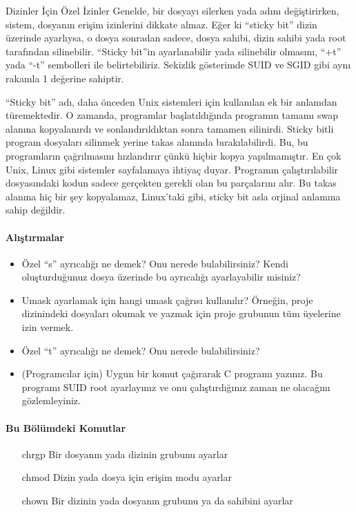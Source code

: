 \begin{section}{Dizinler İçin Özel İzinler}
Genelde, bir dosyayı silerken yada adını değiştirirken, sistem, dosyanın erişim izinlerini dikkate almaz. Eğer ki “sticky bit” dizin üzerinde ayarlıysa, o dosya sonradan sadece, dosya sahibi, dizin sahibi yada root tarafından silinebilir. “Sticky bit”in ayarlanabilir yada silinebilir olmasını, “+t” yada “-t” sembolleri ile belirtebiliriz. Sekizlik gösterimde SUID ve SGID gibi aynı rakamla 1 değerine sahiptir.

“Sticky bit” adı, daha önceden Unix sistemleri için kullanılan ek bir anlamdan türemektedir. O zamanda, programlar başlatıldığında programın tamamı swap alanına kopyalanırdı ve sonlandırıldıktan sonra tamamen silinirdi. Sticky bitli program dosyaları silinmek yerine takas alanında bırakılabilirdi. Bu, bu programların çağrılmasını hızlandırır çünkü hiçbir kopya yapılmamıştır. En çok Unix, Linux gibi sistemler sayfalamaya ihtiyaç duyar. Programın çalıştırılabilir dosyasındaki kodun sadece gerçekten gerekli olan bu parçalarını alır. Bu takas alanına hiç bir şey kopyalamaz, Linux'taki gibi, sticky bit asla orjinal anlamına sahip değildir.

\paragraph{Alıştırmalar}{
\begin{itemize}
 \item Özel “s” ayrıcalığı ne demek? Onu nerede bulabilirsiniz? Kendi oluşturduğunuz dosya üzerinde bu ayrıcalığı ayarlayabilir misiniz?
 \item Umask ayarlamak için hangi umask çağrısı kullanılır? Örneğin, proje dizinindeki dosyaları okumak ve yazmak için proje grubunun tüm üyelerine izin vermek.
 \item Özel “t” ayrıcalığı ne demek? Onu nerede bulabilirsiniz?
 \item (Programcılar için) Uygun bir komut çağırarak C programı yazınız. Bu programı SUID root ayarlayınız ve onu çalıştırdığınız zaman ne olacağını gözlemleyiniz.
 \end{itemize}}

\paragraph{Bu Bölümdeki Komutlar}{
\begin{itemize}
\item[chrgp]Bir dosyanın yada dizinin grubunu ayarlar
\item[chmod]Dizin yada dosya için erişim modu ayarlar
\item[chown]Bir dizinin yada dosyanın grubunu ya da sahibini ayarlar
\end{itemize}}


\end{section}
